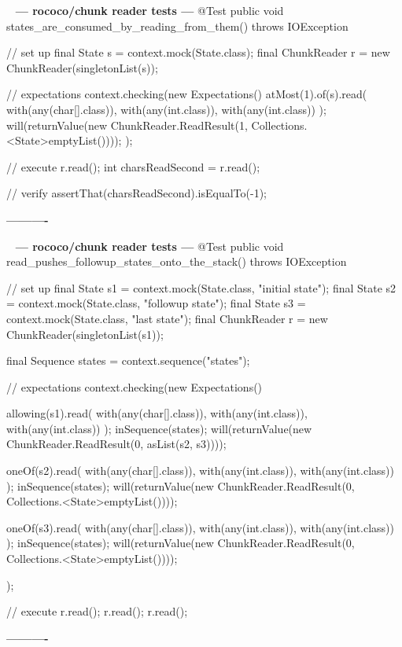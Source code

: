 \documentclass{book}
\newenvironment{chunk}[1]{%
{\ }\newline\noindent%
\hbox{\hskip 2.0cm}{\bf --- #1 ---}%
\verbatim}%                               say exactly what we see
{\endverbatim%
\par{}%
\noindent{}%
\hbox{\hskip 2.0cm}{\bf ----------}%
\par%
\normalsize\noindent}%
\begin{document}
\begin{chunk}{rococo/chunk reader tests}
@Test
public void states_are_consumed_by_reading_from_them() throws IOException {
    // set up
    final State s = context.mock(State.class);
    final ChunkReader r = new ChunkReader(singletonList(s));

    // expectations
    context.checking(new Expectations() {{
        atMost(1).of(s).read(
                with(any(char[].class)), 
                with(any(int.class)), 
                with(any(int.class))
        );
        will(returnValue(new ChunkReader.ReadResult(1, Collections.<State>emptyList())));
    }});

    // execute
    r.read();
    int charsReadSecond = r.read();

    // verify
    assertThat(charsReadSecond).isEqualTo(-1);
}
\end{chunk}

\begin{chunk}{rococo/chunk reader tests}
@Test
public void read_pushes_followup_states_onto_the_stack() throws IOException {
    // set up
    final State s1 = context.mock(State.class, "initial state");
    final State s2 = context.mock(State.class, "followup state");
    final State s3 = context.mock(State.class, "last state");
    final ChunkReader r = new ChunkReader(singletonList(s1));

    final Sequence states = context.sequence("states");

    // expectations
    context.checking(new Expectations() {{
        allowing(s1).read(
                with(any(char[].class)), 
                with(any(int.class)), 
                with(any(int.class))
        );
        inSequence(states);
        will(returnValue(new ChunkReader.ReadResult(0, asList(s2, s3))));

        oneOf(s2).read(
                with(any(char[].class)), 
                with(any(int.class)), 
                with(any(int.class))
        );
        inSequence(states);
        will(returnValue(new ChunkReader.ReadResult(0, Collections.<State>emptyList())));

        oneOf(s3).read(
                with(any(char[].class)), 
                with(any(int.class)), 
                with(any(int.class))
        );
        inSequence(states);
        will(returnValue(new ChunkReader.ReadResult(0, Collections.<State>emptyList())));
    }});

    // execute
    r.read();
    r.read();
    r.read();
}
\end{chunk}
\end{document}
